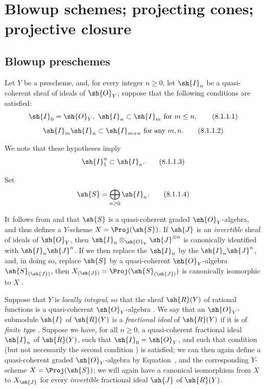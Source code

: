 \section{Blowup schemes; projecting cones; projective closure}
\label{section:II.8}

\subsection{Blowup preschemes}
\label{subsection:II.8.1}
\label{II.8.1}

\begin{env}[8.1.1]
\label{II.8.1.1}
Let $Y$ be a prescheme, and, for every integer $n\geq 0$, let $\sh{I}_n$ be a quasi-coherent sheaf of ideals of $\sh{O}_Y$; suppose that the following conditions are satisfied:
\[
\label{II.8.1.1.1}
  \sh{I}_0=\sh{O}_Y,\ \sh{I}_n\subset\sh{I}_m\text{ for }m\leq n,
\tag{8.1.1.1}
\]
\[
\label{II.8.1.1.2}
  \sh{I}_m\sh{I}_n\subset\sh{I}_{m+n}\text{ for any }m,n.
\tag{8.1.1.2}
\]

We note that these hypotheses imply
\[
\label{II.8.1.1.3}
  \sh{I}_1^n\subset\sh{I}_n.
\tag{8.1.1.3}
\]

Set
\[
\label{II.8.1.1.4}
  \sh{S}=\bigoplus_{n\geq 0}\sh{I}_n.
\tag{8.1.1.4}
\]

It follows from  and  that $\sh{S}$ is a quasi-coherent graded $\sh{O}_Y$-algebra, and thus defines a $Y$-scheme $X=\Proj(\sh{S})$.
If $\sh{J}$ is an \emph{invertible} sheaf of ideals of $\sh{O}_Y$, then $\sh{I}_n\otimes_{\sh{O}_Y}\sh{J}^{\otimes n}$ is canonically identified with $\sh{I}_n\sh{J}^n$.
If we then replace the $\sh{I}_n$ by the $\sh{I}_n\sh{J}^n$, and, in doing so, replace $\sh{S}$ by a quasi-coherent $\sh{O}_Y$-algebra $\sh{S}_{(\sh{J})}$, then $X_{(\sh{J})}=\Proj(\sh{S}_{(\sh{J})})$ is canonically isomorphic to $X$ .
\end{env}

\begin{env}[8.1.2]
\label{II.8.1.2}
Suppose that $Y$ is \emph{locally integral}, so that the sheaf $\sh{R}(Y)$ of rational functions is a quasi-coherent $\sh{O}_Y$-algebra .
We say that an $\sh{O}_Y$-submodule $\sh{I}$ of $\sh{R}(Y)$ is a \emph{fractional ideal} of $\sh{R}(Y)$ if it is of \emph{finite type} .
Suppose we have, for all $n\geq0$, a quasi-coherent fractional ideal $\sh{I}_n$ of $\sh{R}(Y)$, such that $\sh{I}_0 = \sh{O}_Y$, and such that condition  (but not necessarily the second condition ) is satisfied;
we can then again define a quasi-coherent graded $\sh{O}_Y$-algebra by Equation~, and the corresponding $Y$-scheme $X = \Proj(\sh{S})$;
we will again have a canonical isomorphism from $X$ to $X_{{\sh{J}}}$ for every \emph{invertible} fractional ideal $\sh{J}$ of $\sh{R}(Y)$.
\end{env}

